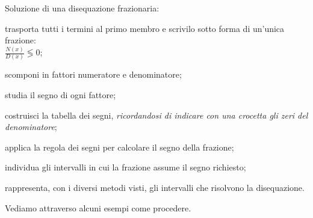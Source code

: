 \begin{procedura}
Soluzione di una disequazione frazionaria:
\begin{enumeratea}
\item trasporta tutti i termini al primo membro e scrivilo sotto forma di 
 un'unica frazione:\\
 $\frac{N(x)}{D(x)} \lessgtr 0$;
\item scomponi in fattori numeratore e denominatore;
\item studia il segno di ogni fattore;
\item costruisci la tabella dei segni, 
\emph{ricordandosi di indicare con una crocetta gli zeri del denominatore};
\item applica la regola dei segni per calcolare il segno della frazione;
\item individua gli intervalli in cui la frazione assume il segno richiesto;
\item rappresenta, con i diversi metodi visti, gli intervalli che 
 risolvono la disequazione.
\end{enumeratea}
\end{procedura}

Vediamo attraverso alcuni esempi come procedere.

